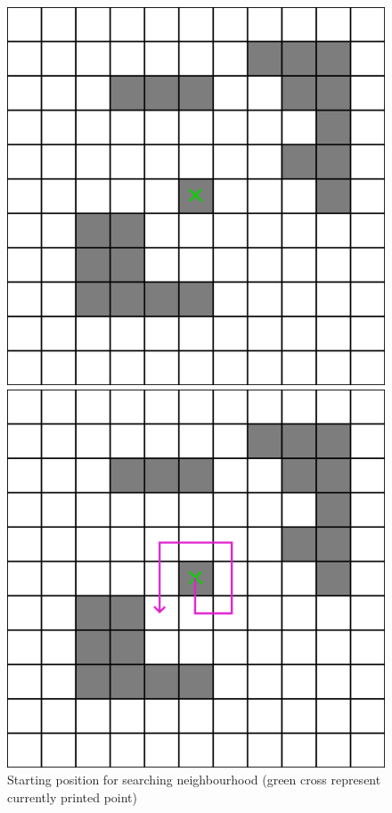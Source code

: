 \documentclass[titlepage]{article}
\newcommand{\multifigcaption}{\captionsetup{justification=justified}}
\begin{document}
\begin{figure}[H]
 	\begin{center}
 		\begin{minipage}{0.45\linewidth}
 			\includegraphics[width=\textwidth]{img/greedy/example-neighbours-starting.png}
 			\multifigcaption
 			\caption{Starting position for searching neighbourhood (green cross represent currently printed point)}
 			\label{img:greedy/example-neighbours-stating}
 		\end{minipage}
 		\hspace{.05\linewidth}
 		\begin{minipage}{.45\linewidth}
 			\includegraphics[width=\textwidth]{img/greedy/example-neighbours-neigh-1.png}

\end{minipage}
\end{center}
\end{figure}
\end{document}
